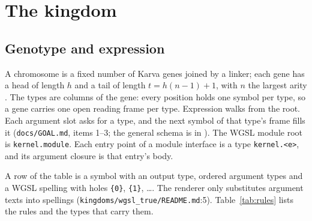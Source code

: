 \documentclass[sigconf,nonacm]{acmart}
\newcommand{\code}[1]{\nolinkurl{#1}}
\newcommand{\src}[1]{{\footnotesize\nolinkurl{#1}}}
\begin{document}
\section{The kingdom}
\label{sec:kingdom}

\subsection{Genotype and expression}
A chromosome is a fixed number of Karva genes joined by a linker; each gene has
a head of length $h$ and a tail of length $t=h(n-1)+1$, with $n$ the largest
arity \cite{ferreira2001gep}. The types are columns of the gene: every
position holds one symbol per type, so a gene carries one open reading frame
per type. Expression walks from the root. Each argument slot asks for a type,
and the next symbol of that type's frame fills it (\src{docs/GOAL.md}, items
1--3; the general schema is in \cite{morgan_core}). The WGSL module root is
\code{kernel.module}. Each entry point of a module interface is a type
\code{kernel.<e>}, and its argument closure is that entry's body.

A row of the table is a symbol with an output type, ordered argument types and
a WGSL spelling with holes \texttt{\{0\}}, \texttt{\{1\}}, \ldots. The renderer only
substitutes argument texts into spellings (\src{kingdoms/wgsl_true/README.md}:5).
Table~\ref{tab:rules} lists the rules and the types that carry them.
\end{document}
